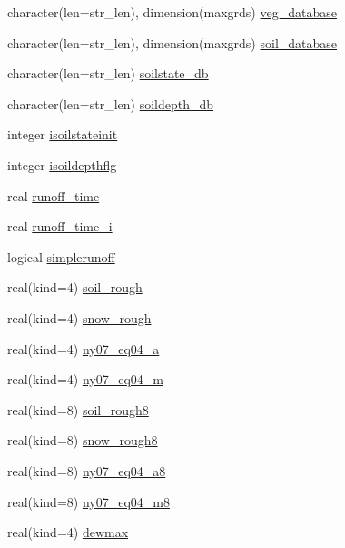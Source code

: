 \begin{DoxyCompactItemize}
\item 
character(len=str\+\_\+len), dimension(maxgrds) \hyperlink{namespacesoil__coms_a635e352f4923b8060b939ac82c23dbef}{veg\+\_\+database}
\item 
character(len=str\+\_\+len), dimension(maxgrds) \hyperlink{namespacesoil__coms_a194bdfd0c85724271f3424bb0674755f}{soil\+\_\+database}
\item 
character(len=str\+\_\+len) \hyperlink{namespacesoil__coms_a7a54852974f4d42c4e4bfbd1145a3e44}{soilstate\+\_\+db}
\item 
character(len=str\+\_\+len) \hyperlink{namespacesoil__coms_a5d607eec910da5341af027871e06a16e}{soildepth\+\_\+db}
\item 
integer \hyperlink{namespacesoil__coms_a947d75e4045f6ba45a69e5334f834222}{isoilstateinit}
\item 
integer \hyperlink{namespacesoil__coms_a8495256902c21d8ea298192d9e9a9f60}{isoildepthflg}
\item 
real \hyperlink{namespacesoil__coms_a4560c15d785323d98ca7f84a60e07fd2}{runoff\+\_\+time}
\item 
real \hyperlink{namespacesoil__coms_abbda4cf2bb85860666afd7f70310f519}{runoff\+\_\+time\+\_\+i}
\item 
logical \hyperlink{namespacesoil__coms_ae8cfc7c2c5c0a303067e834b6ba03694}{simplerunoff}
\item 
real(kind=4) \hyperlink{namespacesoil__coms_a2bcc1e9ab626c4a0ac76283c272805c6}{soil\+\_\+rough}
\item 
real(kind=4) \hyperlink{namespacesoil__coms_a42917920add793523d269a722a3cfa3b}{snow\+\_\+rough}
\item 
real(kind=4) \hyperlink{namespacesoil__coms_aabd4871bca5e3dfef69f79324610f998}{ny07\+\_\+eq04\+\_\+a}
\item 
real(kind=4) \hyperlink{namespacesoil__coms_a881853a16ef7d613c94c38cc5f56f4c0}{ny07\+\_\+eq04\+\_\+m}
\item 
real(kind=8) \hyperlink{namespacesoil__coms_a33d9bb430514fde199b526e39479b7a4}{soil\+\_\+rough8}
\item 
real(kind=8) \hyperlink{namespacesoil__coms_a205c07f5f6550972f802f9444dfc934c}{snow\+\_\+rough8}
\item 
real(kind=8) \hyperlink{namespacesoil__coms_a559c28af94beb8a91e67184ebcb73c6e}{ny07\+\_\+eq04\+\_\+a8}
\item 
real(kind=8) \hyperlink{namespacesoil__coms_a07f28ceeca19ec2e550501c1bc0fc39d}{ny07\+\_\+eq04\+\_\+m8}
\item 
real(kind=4) \hyperlink{namespacesoil__coms_a633ce5532050eb5cf840d24a6da41ca1}{dewmax}

\end{DoxyCompactItemize}
